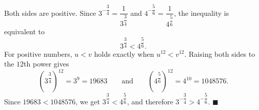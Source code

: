 Both sides are positive. Since $3^{-\dfrac34}=\dfrac{1}{3^{\dfrac34}}$ and $4^{-\dfrac56}=\dfrac{1}{4^{\dfrac56}}$, the inequality is equivalent to
\[3^{\dfrac34}<4^{\dfrac56}.\]
For positive numbers, $u<v$ holds exactly when $u^{12}<v^{12}$. Raising both sides to the $12$th power gives
\[\left(3^{\dfrac34}\right)^{12}=3^9=19683\qquad\text{and}\qquad\left(4^{\dfrac56}\right)^{12}=4^{10}=1048576.\]
Since $19683<1048576$, we get $3^{\dfrac34}<4^{\dfrac56}$, and therefore $3^{-\dfrac34}>4^{-\dfrac56}$. $\blacksquare$
